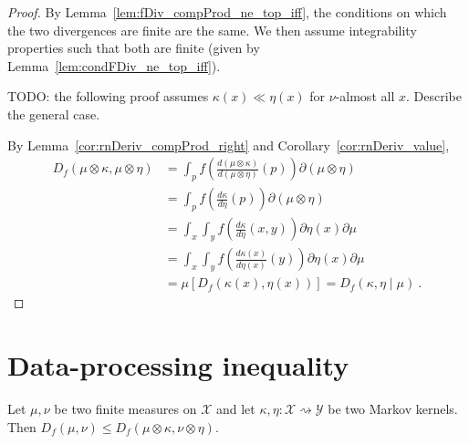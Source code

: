 \begin{proof} \leanok
{}
By Lemma~\ref{lem:fDiv_compProd_ne_top_iff}, the conditions on which the two divergences are finite are the same. We then assume integrability properties such that both are finite (given by Lemma~\ref{lem:condFDiv_ne_top_iff}).

TODO: the following proof assumes $\kappa(x) \ll \eta(x)$ for $\nu$-almost all $x$. Describe the general case.

By Lemma~\ref{cor:rnDeriv_compProd_right} and Corollary~\ref{cor:rnDeriv_value},
\begin{align*}
D_f(\mu \otimes \kappa, \mu \otimes \eta)
&= \int_{p} f\left(\frac{d (\mu \otimes \kappa)}{d (\mu \otimes \eta)}(p)\right) \partial(\mu \otimes \eta)
\\
&= \int_{p} f\left(\frac{d \kappa}{d \eta}(p)\right) \partial(\mu \otimes \eta)
\\
&= \int_x \int_y f\left(\frac{d \kappa}{d \eta}(x, y)\right) \partial \eta(x) \partial \mu
\\
&= \int_x \int_y f\left(\frac{d \kappa(x)}{d \eta(x)}(y)\right) \partial \eta(x) \partial \mu
\\
&= \mu\left[D_f(\kappa(x), \eta(x))\right]
= D_f(\kappa, \eta \mid \mu)
\: .
\end{align*}
\end{proof}

\section{Data-processing inequality}

\begin{theorem}
  \label{thm:fDiv_le_compProd}
  \leanok
  Let $\mu, \nu$ be two finite measures on $\mathcal X$ and let $\kappa, \eta : \mathcal X \rightsquigarrow \mathcal Y$ be two Markov kernels.
  Then $D_f(\mu, \nu) \le D_f(\mu \otimes \kappa, \nu \otimes \eta)$.
\end{theorem}

